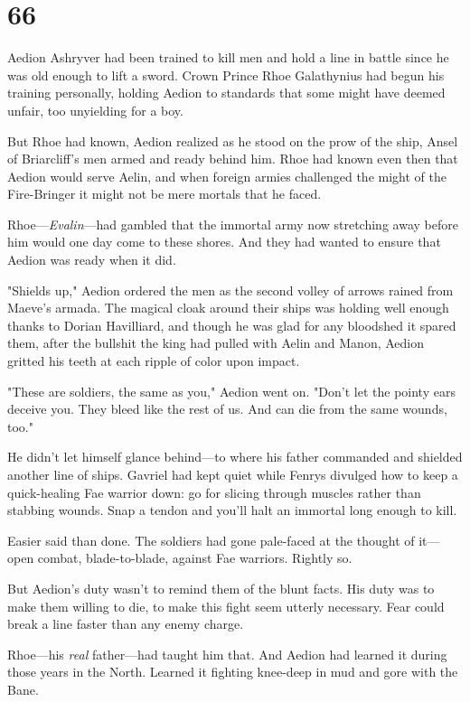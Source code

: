 
\chapter{66}

Aedion Ashryver had been trained to kill men and hold a line in battle since he was old enough to lift a sword. Crown Prince Rhoe Galathynius had begun his training personally, holding Aedion to standards that some might have deemed unfair, too unyielding for a boy.

But Rhoe had known, Aedion realized as he stood on the prow of the ship, Ansel of Briarcliff's men armed and ready behind him. Rhoe had known even then that Aedion would serve Aelin, and when foreign armies challenged the might of the Fire-Bringer  it might not be mere mortals that he faced.

Rhoe---\emph{Evalin}---had gambled that the immortal army now stretching away before him would one day come to these shores. And they had wanted to ensure that Aedion was ready when it did.

"Shields up," Aedion ordered the men as the second volley of arrows rained from Maeve's armada. The magical cloak around their ships was holding well enough thanks to Dorian Havilliard, and though he was glad for any bloodshed it spared them, after the bullshit the king had pulled with Aelin and Manon, Aedion gritted his teeth at each ripple of color upon impact.

"These are soldiers, the same as you," Aedion went on. "Don't let the pointy ears deceive you. They bleed like the rest of us. And can die from the same wounds, too."

He didn't let himself glance behind---to where his father commanded and shielded another line of ships. Gavriel had kept quiet while Fenrys divulged how to keep a quick-healing Fae warrior down: go for slicing through muscles rather than stabbing wounds. Snap a tendon and you'll halt an immortal long enough to kill.

Easier said than done. The soldiers had gone pale-faced at the thought of it--- open combat, blade-to-blade, against Fae warriors. Rightly so.

But Aedion's duty wasn't to remind them of the blunt facts. His duty was to make them willing to die, to make this fight seem utterly necessary. Fear could break a line faster than any enemy charge.

Rhoe---his \emph{real} father---had taught him that. And Aedion had learned it during those years in the North. Learned it fighting knee-deep in mud and gore with the Bane.

